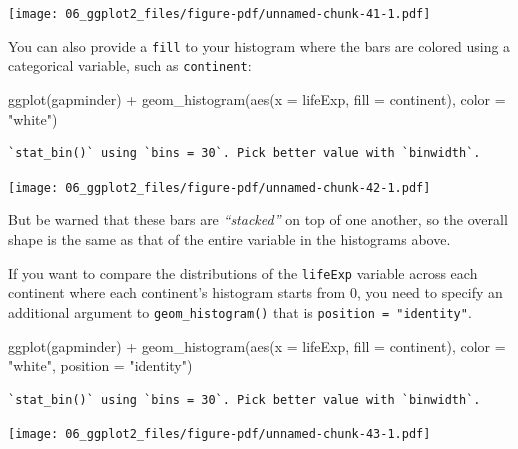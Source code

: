 \documentclass[
  letterpaper,
  DIV=11,
  numbers=noendperiod]{scrreprt}
\newenvironment{Shaded}{\begin{snugshade}}{\end{snugshade}}
\newcommand{\AttributeTok}[1]{\textcolor[rgb]{0.40,0.45,0.13}{#1}}
\newcommand{\FunctionTok}[1]{\textcolor[rgb]{0.28,0.35,0.67}{#1}}
\newcommand{\NormalTok}[1]{\textcolor[rgb]{0.00,0.23,0.31}{#1}}
\newcommand{\SpecialCharTok}[1]{\textcolor[rgb]{0.37,0.37,0.37}{#1}}
\newcommand{\StringTok}[1]{\textcolor[rgb]{0.13,0.47,0.30}{#1}}
\begin{document}
\texttt{[image: 06\_ggplot2\_files/figure-pdf/unnamed-chunk-41-1.pdf]}

You can also provide a \texttt{fill} to your histogram where the bars
are colored using a categorical variable, such as \texttt{continent}:

\begin{Shaded}
\begin{Highlighting}[]
\FunctionTok{ggplot}\NormalTok{(gapminder) }\SpecialCharTok{+} 
  \FunctionTok{geom\_histogram}\NormalTok{(}\FunctionTok{aes}\NormalTok{(}\AttributeTok{x =}\NormalTok{ lifeExp, }\AttributeTok{fill =}\NormalTok{ continent), }
                 \AttributeTok{color =} \StringTok{"white"}\NormalTok{)}
\end{Highlighting}
\end{Shaded}

\begin{verbatim}
`stat_bin()` using `bins = 30`. Pick better value with `binwidth`.
\end{verbatim}

\texttt{[image: 06\_ggplot2\_files/figure-pdf/unnamed-chunk-42-1.pdf]}

But be warned that these bars are \emph{``stacked''} on top of one
another, so the overall shape is the same as that of the entire variable
in the histograms above.

If you want to compare the distributions of the \texttt{lifeExp}
variable across each continent where each continent's histogram starts
from 0, you need to specify an additional argument to
\texttt{geom\_histogram()} that is \texttt{position\ =\ "identity"}.

\begin{Shaded}
\begin{Highlighting}[]
\FunctionTok{ggplot}\NormalTok{(gapminder) }\SpecialCharTok{+} 
  \FunctionTok{geom\_histogram}\NormalTok{(}\FunctionTok{aes}\NormalTok{(}\AttributeTok{x =}\NormalTok{ lifeExp, }\AttributeTok{fill =}\NormalTok{ continent), }
                 \AttributeTok{color =} \StringTok{"white"}\NormalTok{,}
                 \AttributeTok{position =} \StringTok{"identity"}\NormalTok{)}
\end{Highlighting}
\end{Shaded}

\begin{verbatim}
`stat_bin()` using `bins = 30`. Pick better value with `binwidth`.
\end{verbatim}

\texttt{[image: 06\_ggplot2\_files/figure-pdf/unnamed-chunk-43-1.pdf]}
\end{document}
